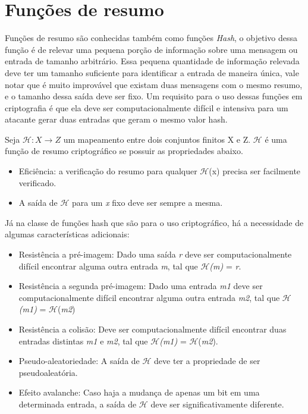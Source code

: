 \documentclass{ufsctex/ufsctex}
\begin{document}
\section{Funções de resumo}

Funções de resumo são conhecidas também como funções \textit{Hash}, o objetivo
dessa função é de relevar uma pequena porção de informação sobre uma mensagem
ou entrada de tamanho arbitrário. Essa pequena quantidade de informação
relevada deve ter um tamanho suficiente para identificar a entrada de maneira
única, vale notar que é muito improvável que existam duas mensagens com o mesmo
resumo, e o tamanho dessa saída deve ser fixo. Um requisito para o uso dessas
funções em criptografia é que ela deve ser computacionalmente difícil e
intensiva para um atacante gerar duas entradas que geram o mesmo valor hash.
\cite{cryptoschool}

Seja $\mathcal{H} : X \longrightarrow Z$ um mapeamento entre dois conjuntos
finitos X e Z. $\mathcal{H}$  é uma função de resumo criptográfico se possuir
as propriedades abaixo.

\begin{itemize}

	\item Eficiência: a verificação do resumo para qualquer $\mathcal{H}$(x)
		precisa ser facilmente verificado.
	\item A saída de $\mathcal{H}$ para um \textit{x} fixo deve ser sempre a
		mesma.

\end{itemize}

Já na classe de funções hash que são para o uso criptográfico, há a necessidade
de algumas características adicionais:

\begin{itemize}

	\item Resistência a pré-imagem: Dado uma saída \textit{r} deve ser
		computacionalmente difícil encontrar alguma outra entrada \textit{m},
		tal que $\mathcal{H}$\textit{(m)} = \textit{r}.
	\item Resistência a segunda pré-imagem: Dado uma entrada \textit{m1} deve
		ser computacionalmente difícil encontrar alguma outra entrada
		\textit{m2}, tal que $\mathcal{H}$\textit{(m1)} =
		$\mathcal{H}$(\textit{m2})
	\item Resistência a colisão: Deve ser computacionalmente difícil encontrar
		duas entradas distintas \textit{m1} e \textit{m2}, tal que
		$\mathcal{H}$\textit{(m1)} = $\mathcal{H}$(\textit{m2}).
	\item Pseudo-aleatoriedade: A saída de $\mathcal{H}$ deve ter a propriedade
		de ser pseudoaleatória.
	\item Efeito avalanche: Caso haja a mudança de apenas um bit em uma
		determinada entrada, a saída de $\mathcal{H}$ deve ser significativamente
		diferente.

\end{itemize}
\end{document}
